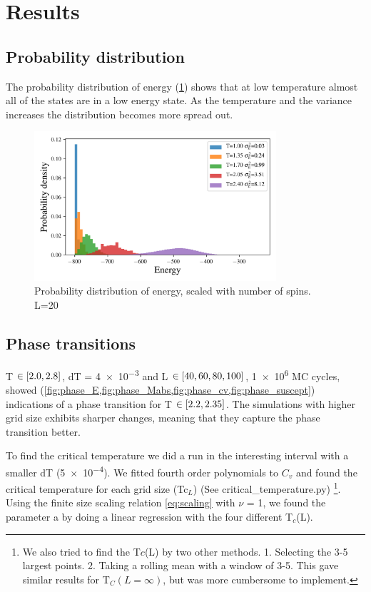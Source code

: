 \section{Results}




\subsection{Probability distribution}

The probability distribution of energy (\cref{fig:distribution}) shows that
at low temperature almost all of the states are in a low energy state.
As the temperature and the variance increases the distribution becomes more
spread out.

\begin{figure}[H]
  \centering
  \includegraphics[width=0.8\textwidth]{../figures/distribution.png}
  \caption{Probability distribution of energy, scaled with number of spins. L=20}
  \label{fig:distribution}
\end{figure}




\subsection{Phase transitions}

T $\in \left[2.0,2.8\right]$, dT = \num{4e-3} and L $\in \left[40,60,80,100\right]$,
\num{1e6} MC cycles,
showed (\cref{fig:phase_E,fig:phase_Mabs,fig:phase_cv,fig:phase_suscept})
indications of a phase transition for T $\in \left[2.2,2.35\right]$. The simulations
with higher grid size exhibits sharper changes, meaning that they capture
the phase transition better.

To find the critical temperature we did a run in the interesting interval with a
smaller dT (\num{5e-4}). We fitted fourth order polynomials to $C_v$ and found
the critical temperature for each grid size (Tc$_{L}$) (See
critical\_temperature.py) \footnote{We also tried to find the T$c$(L) by two
other methods. 1. Selecting the 3-5 largest points. 2. Taking a rolling mean
with a window of 3-5. This gave similar results for T$_C(L=\infty)$, but was
more cumbersome to implement.}. Using the finite size scaling relation
\cref{eq:scaling} with $\nu$ = 1, we found the parameter a by doing a linear
regression with the four different T$_c$(L).


